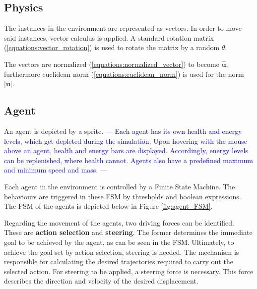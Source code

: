 \subsection{Physics} \label{subsection:physics}
The instances in the environment are represented as vectors.
In order to move said instances, vector calculus is applied.
A standard rotation matrix (\ref{equations:vector_rotation}) is used to rotate the matrix by a random $\theta$.



The vectors are normalized (\ref{equations:normalized_vector}) to become $\mathbf {\hat {u}}$, 
furthermore euclidean norm (\ref{equations:euclidean_norm}) is used for the norm $|\mathbf {u} |$.




\subsection{Agent} \label{subsection:agent}

An agent is depicted by a sprite.
\textcolor{blue}{---
Each agent has its own health and energy levels, which get depleted during the simulation.
Upon hovering with the mouse above an agent, health and energy bars are displayed.
Accordingly, energy levels can be replenished, where health cannot.
Agents also have a predefined maximum and minimum speed and mass.
---}


Each agent in the environment is controlled by a Finite State Machine.
The behaviours are triggered in these FSM by thresholds and boolean expressions.
The FSM of the agents is depicted below in Figure \ref{fig:agent_FSM}.

Regarding the movement of the agents, two driving forces can be identified.
These are \textbf{action selection} and \textbf{steering}.
The former determines the immediate goal to be achieved by the agent, as can be seen in the FSM.
Ultimately, to achieve the goal set by action selection, steering is needed.
The mechanism is responsible for calculating the desired trajectories required to carry out the selected action.
For steering to be applied, a steering force is necessary.
This force describes the direction and velocity of the desired displacement.



